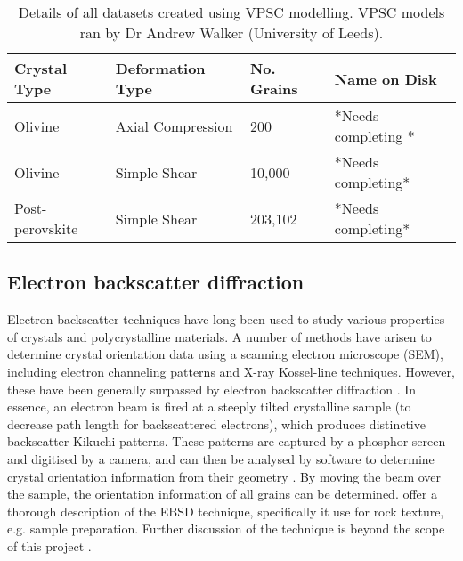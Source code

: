 \documentclass[a4paper,12pt,twoside]{report}
\numberwithin{equation}{chapter}
\begin{document}
\begin{table} 
	\centering
	\caption[VPSC datasets]{Details of all datasets created using VPSC modelling. VPSC models ran by Dr Andrew Walker (University of Leeds).\\}
\begin{tabularx}{\textwidth}{X X X X}
	\hline
	\hline
	Crystal Type    & Deformation Type  & No. Grains & Name on Disk \\
	\hline
	\hline
	Olivine         & Axial Compression & 200        & *Needs completing *    \\
	Olivine         & Simple Shear      & 10,000     & *Needs completing*    \\
	Post-perovskite & Simple Shear      & 203,102    & *Needs completing*    \\
	\hline
	\end{tabularx}
\label{tab:VPSC_data}
\end{table}

\subsection{Electron backscatter diffraction}
Electron backscatter techniques have long been used to study various properties of crystals and polycrystalline materials. A number of methods have arisen to determine crystal orientation data using a scanning electron microscope (SEM), including electron channeling patterns and X-ray Kossel-line techniques. However, these have been generally surpassed by electron backscatter diffraction \citep[EBSD or backscatter Kikuchi diffraction,][]{Harland1973}.  In essence, an electron beam is fired at a steeply tilted crystalline sample (to decrease path length for backscattered electrons), which produces distinctive backscatter Kikuchi patterns. These patterns are captured by a phosphor screen and digitised by a camera, and can then be analysed by software to determine crystal orientation information from their geometry  \citep{Zaefferer2007}. By moving the beam over the sample, the orientation information of all grains can be determined. \cite{Prior1999} offer a thorough description of the EBSD technique, specifically it use for rock texture, e.g. sample preparation. Further discussion of the technique is beyond the scope of this project \citep[see][for more info]{Schwarzer1997,Randle2000}.    
\end{document}
